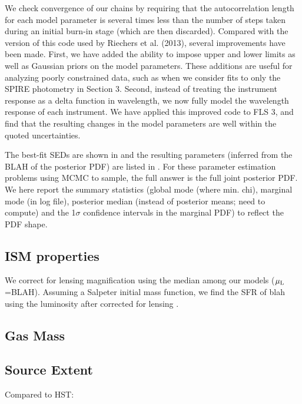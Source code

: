 \documentclass[]{emulateapj}
\begin{document}
We check convergence of our chains by requiring that the autocorrelation length for each model parameter is several times less than the number of steps taken during an initial burn-in stage (which are then discarded).
Compared with the version of this code used by Riechers et al. (2013), several improvements have been made. First, we have added the ability to impose upper and lower limits as well as Gaussian priors on the model parameters. These additions are useful for analyzing poorly constrained data, such as when we consider fits to only the SPIRE photometry in Section 3. Second, instead of treating the instrument response as a delta function in wavelength, we now fully model the wavelength response of each instrument. We have applied this improved code to FLS 3, and find that the resulting changes in the model parameters are well within the quoted uncertainties.

The best-fit SEDs are shown in  and the resulting parameters (inferred from the BLAH of the posterior PDF) are listed in .
For these parameter estimation problems using MCMC to sample,
the full answer is the full joint posterior PDF.
We here report the summary statistics (global mode (where min. chi),
marginal mode (in log file),
posterior median (instead of posterior means; need to compute) and the 1$\sigma$ confidence intervals in the marginal PDF) to reflect the PDF shape.



\subsection{ISM properties}
We correct for lensing magnification using the median among our models ($\mu_{\rm L}$=BLAH).
Assuming a Salpeter initial mass function, we find the SFR of blah using the \fir luminosity after corrected for lensing .
\subsection{Gas Mass}
\subsection{Source Extent}
Compared to HST:

\end{document}
